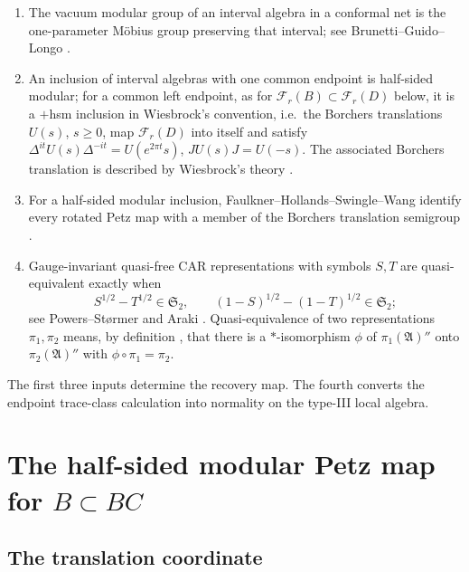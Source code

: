 \documentclass[11pt]{article}
\theoremstyle{accent}
\theoremstyle{definition}
\newcommand{\cF}{\mathcal{F}}
\newcommand{\Stwo}{\mathfrak{S}_2}
\begin{document}
\begin{enumerate}
  \item The vacuum modular group of an interval algebra in a conformal net is the one-parameter M\"obius group preserving that interval; see Brunetti--Guido--Longo \cite{BGL}.
  \item An inclusion of interval algebras with one common endpoint is half-sided modular; for a common left endpoint, as for \(\cF_r(B)\subset\cF_r(D)\) below, it is a \(+\)hsm inclusion in Wiesbrock's convention, i.e.\ the Borchers translations \(U(s)\), \(s\ge0\), map \(\cF_r(D)\) into itself and satisfy \(\Delta^{it}U(s)\Delta^{-it}=U(e^{2\pi t}s)\), \(JU(s)J=U(-s)\).  The associated Borchers translation is described by Wiesbrock's theory \cite{Wiesbrock}.
  \item For a half-sided modular inclusion, Faulkner--Hollands--Swingle--Wang identify every rotated Petz map with a member of the Borchers translation semigroup \cite[Sec.~4.2]{FHWS}.
  \item Gauge-invariant quasi-free CAR representations with symbols \(S,T\) are quasi-equivalent exactly when
  \[
    S^{1/2}-T^{1/2}\in\Stwo,
    \qquad
    (1-S)^{1/2}-(1-T)^{1/2}\in\Stwo;
  \]
  see Powers--St\o rmer \cite[Thm.~5.1, p.~25]{PowersStormer} and Araki \cite{ArakiCAR}.  Quasi-equivalence of two representations \(\pi_1,\pi_2\) means, by definition \cite[Def.~1.1 and p.~4]{PowersStormer}, that there is a \(*\)-isomorphism \(\phi\) of \(\pi_1(\mathfrak A)''\) onto \(\pi_2(\mathfrak A)''\) with \(\phi\circ\pi_1=\pi_2\).
\end{enumerate}

The first three inputs determine the recovery map.  The fourth converts the endpoint trace-class calculation into normality on the type-III local algebra.

\section{The half-sided modular Petz map for \texorpdfstring{\(B\subset BC\)}{B contained in BC}}

\subsection{The translation coordinate}
\end{document}
